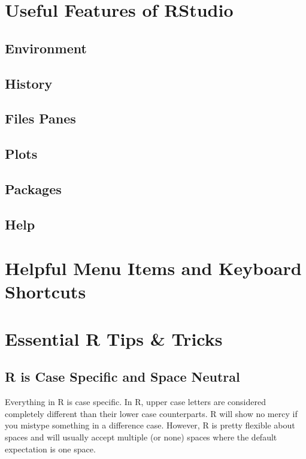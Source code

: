 \documentclass[10pt, letterpaper, twoside]{memoir}\usepackage{knitr}
\begin{document}
\section{Useful Features of RStudio}

\subsection{Environment}

\subsection{History}

\subsection{Files Panes}

\subsection{Plots}

\subsection{Packages}

\subsection{Help}

\section{Helpful Menu Items and Keyboard Shortcuts}

\section{Essential R Tips \& Tricks}

\subsection{R is Case Specific and Space Neutral}

Everything in R is case specific. In R, upper case letters are considered completely different than their lower case counterparts. R will show no mercy if you mistype something in a difference case. However, R is pretty flexible about spaces and will usually accept multiple (or none) spaces where the default expectation is one space. 
\end{document}
